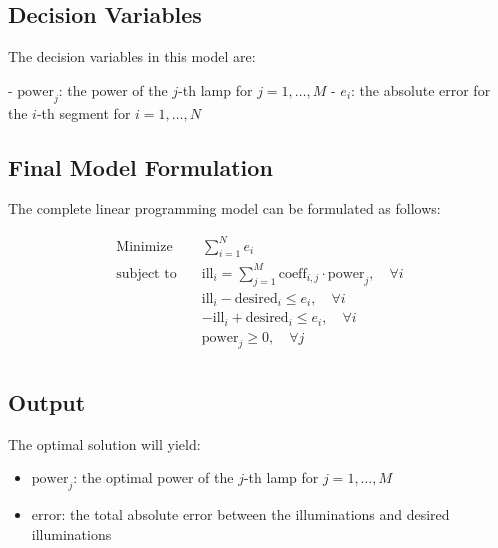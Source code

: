\documentclass{article}
\begin{document}
\subsection*{Decision Variables}

The decision variables in this model are:

- \(\text{power}_j\): the power of the \(j\)-th lamp for \(j = 1, \ldots, M\)
- \(e_i\): the absolute error for the \(i\)-th segment for \(i = 1, \ldots, N\)

\subsection*{Final Model Formulation}

The complete linear programming model can be formulated as follows:

\[
\begin{align*}
\text{Minimize} \quad & \sum_{i=1}^{N} e_i \\
\text{subject to} \quad & \text{ill}_i = \sum_{j=1}^{M} \text{coeff}_{i,j} \cdot \text{power}_j, \quad \forall i \\
& \text{ill}_i - \text{desired}_i \leq e_i, \quad \forall i \\
& -\text{ill}_i + \text{desired}_i \leq e_i, \quad \forall i \\
& \text{power}_j \geq 0, \quad \forall j \\
\end{align*}
\]

\subsection*{Output}

The optimal solution will yield:

\begin{itemize}
    \item \(\text{power}_j\): the optimal power of the \(j\)-th lamp for \(j = 1, \ldots, M\)
    \item \(\text{error}\): the total absolute error between the illuminations and desired illuminations
\end{itemize}
\end{document}

